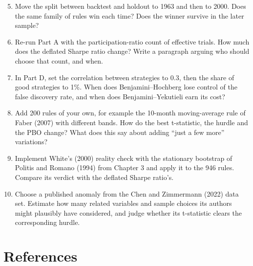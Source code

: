 \begin{enumerate}
  \setcounter{enumi}{4}
  \item Move the split between backtest and holdout to 1963 and then to 2000. Does the same family of rules win each time? Does the winner survive in the later sample?
  \item Re-run Part A with the participation-ratio count of effective trials. How much does the deflated Sharpe ratio change? Write a paragraph arguing who should choose that count, and when.
  \item In Part D, set the correlation between strategies to 0.3, then the share of good strategies to 1\%. When does Benjamini--Hochberg lose control of the false discovery rate, and when does Benjamini--Yekutieli earn its cost?
  \item Add 200 rules of your own, for example the 10-month moving-average rule of Faber (2007) with different bands. How do the best t-statistic, the hurdle and the PBO change? What does this say about adding ``just a few more'' variations?
  \item Implement White's (2000) reality check with the stationary bootstrap of Politis and Romano (1994) from Chapter 3 and apply it to the 946 rules. Compare its verdict with the deflated Sharpe ratio's.
  \item Choose a published anomaly from the Chen and Zimmermann (2022) data set. Estimate how many related variables and sample choices its authors might plausibly have considered, and judge whether its t-statistic clears the corresponding hurdle.
\end{enumerate}

\section*{References}

